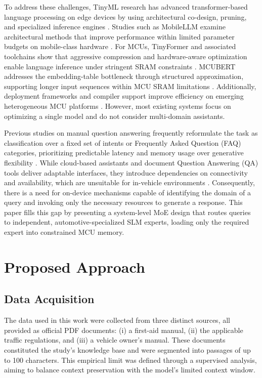 \documentclass[conference]{IEEEtran}
\begin{document}
To address these challenges, TinyML research has advanced transformer-based language processing on edge devices by using architectural co-design, pruning, and specialized inference engines \cite{yang2023tinyformer}. Studies such as MobileLLM examine architectural methods that improve performance within limited parameter budgets on mobile-class hardware \cite{liu_mobilellm_2024}. For MCUs, TinyFormer and associated toolchains show that aggressive compression and hardware-aware optimization enable language inference under stringent SRAM constraints \cite{yang2023tinyformer}. MCUBERT addresses the embedding-table bottleneck through structured approximation, supporting longer input sequences within MCU SRAM limitations \cite{10.1145/3676536.3676747}. Additionally, deployment frameworks and compiler support improve efficiency on emerging heterogeneous MCU platforms \cite{scherer2024deeploy}. However, most existing systems focus on optimizing a single model and do not consider multi-domain assistants. 

Previous studies on manual question answering frequently reformulate the task as classification over a fixed set of intents or Frequently Asked Question (FAQ) categories, prioritizing predictable latency and memory usage over generative flexibility \cite{electronics13244972}. While cloud-based assistants and document Question Answering (QA) tools deliver adaptable interfaces, they introduce dependencies on connectivity and availability, which are unsuitable for in-vehicle environments \cite{lee2023llmchatbot}. Consequently, there is a need for on-device mechanisms capable of identifying the domain of a query and invoking only the necessary resources to generate a response. This paper fills this gap by presenting a system-level MoE design that routes queries to independent, automotive-specialized SLM experts, loading only the required expert into constrained MCU memory.

\section{Proposed Approach} \label{sec:approach}

\subsection{Data Acquisition}

The data used in this work were collected from three distinct sources, all provided as official PDF documents: (i) a first-aid manual, (ii) the applicable traffic regulations, and (iii) a vehicle owner’s manual. These documents constituted the study’s knowledge base and were segmented into passages of up to 100 characters. This empirical limit was defined through a supervised analysis, aiming to balance context preservation with the model’s limited context window.
\end{document}
